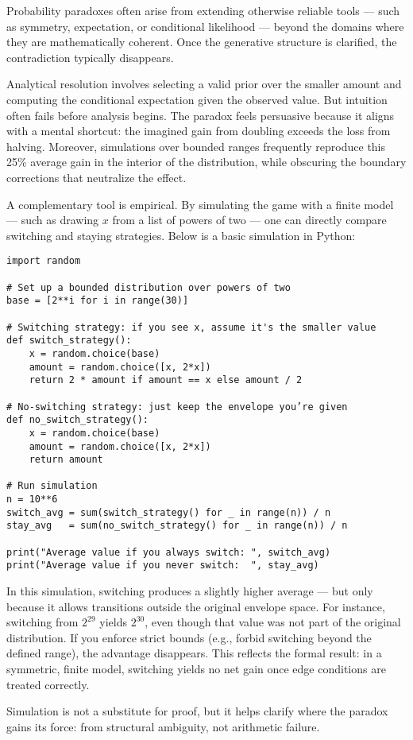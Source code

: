 \clearpage

\begin{commentary}
Probability paradoxes often arise from extending otherwise reliable tools — such as symmetry, expectation, or conditional likelihood — beyond the domains where they are mathematically coherent. Once the generative structure is clarified, the contradiction typically disappears.

Analytical resolution involves selecting a valid prior over the smaller amount and computing the conditional expectation given the observed value. But intuition often fails before analysis begins. The paradox feels persuasive because it aligns with a mental shortcut: the imagined gain from doubling exceeds the loss from halving. Moreover, simulations over bounded ranges frequently reproduce this 25\% average gain in the interior of the distribution, while obscuring the boundary corrections that neutralize the effect.

A complementary tool is empirical. By simulating the game with a finite model — such as drawing $x$ from a list of powers of two — one can directly compare switching and staying strategies. Below is a basic simulation in Python:

\begin{verbatim}
import random

# Set up a bounded distribution over powers of two
base = [2**i for i in range(30)]

# Switching strategy: if you see x, assume it's the smaller value
def switch_strategy():
    x = random.choice(base)
    amount = random.choice([x, 2*x])
    return 2 * amount if amount == x else amount / 2

# No-switching strategy: just keep the envelope you’re given
def no_switch_strategy():
    x = random.choice(base)
    amount = random.choice([x, 2*x])
    return amount

# Run simulation
n = 10**6
switch_avg = sum(switch_strategy() for _ in range(n)) / n
stay_avg   = sum(no_switch_strategy() for _ in range(n)) / n

print("Average value if you always switch: ", switch_avg)
print("Average value if you never switch:  ", stay_avg)
\end{verbatim}

In this simulation, switching produces a slightly higher average — but only because it allows transitions outside the original envelope space. For instance, switching from \( 2^{29} \) yields \( 2^{30} \), even though that value was not part of the original distribution. If you enforce strict bounds (e.g., forbid switching beyond the defined range), the advantage disappears. This reflects the formal result: in a symmetric, finite model, switching yields no net gain once edge conditions are treated correctly.

Simulation is not a substitute for proof, but it helps clarify where the paradox gains its force: from structural ambiguity, not arithmetic failure.

\end{commentary}
